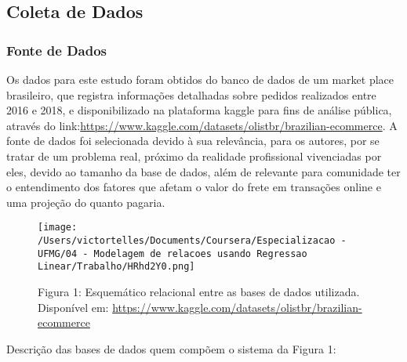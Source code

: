 \documentclass[
]{article}
\begin{document}
\hypertarget{coleta-de-dados}{%
\subsection{Coleta de Dados}\label{coleta-de-dados}}

\hypertarget{fonte-de-dados}{%
\subsubsection{Fonte de Dados}\label{fonte-de-dados}}

Os dados para este estudo foram obtidos do banco de dados de um market
place brasileiro, que registra informações detalhadas sobre pedidos
realizados entre 2016 e 2018, e disponibilizado na plataforma kaggle
para fins de análise pública, através do
link:\url{https://www.kaggle.com/datasets/olistbr/brazilian-ecommerce}.
A fonte de dados foi selecionada devido à sua relevância, para os
autores, por se tratar de um problema real, próximo da realidade
profissional vivenciadas por eles, devido ao tamanho da base de dados,
além de relevante para comunidade ter o entendimento dos fatores que
afetam o valor do frete em transações online e uma projeção do quanto
pagaria.

\begin{figure}
\centering
\texttt{[image: /Users/victortelles/Documents/Coursera/Especializacao - UFMG/04 - Modelagem de relacoes usando Regressao Linear/Trabalho/HRhd2Y0.png]}
\caption{Figura 1: Esquemático relacional entre as bases de dados
utilizada. Disponível em:
\url{https://www.kaggle.com/datasets/olistbr/brazilian-ecommerce}}
\end{figure}

Descrição das bases de dados quem compõem o sistema da Figura 1:
\end{document}
